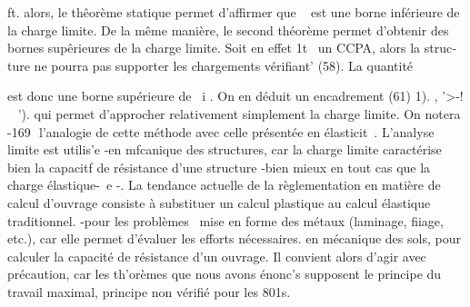 ft. 
alors, le thêorème statique permet d'affirmer que ~ est une borne inférieu­re de la charge limite. 
De la même manière, le second théorème permet d'obtenir des bornes supêrieures de la charge limite. Soit en effet 1t~ un CCPA, alors la struc­ture ne pourra pas supporter les chargements vérifiant' (58). La quantité 

est donc une borne supérieure de ~i . On en déduit un encadrement 
(61) 1). , '>-! ~ '). 
qui permet d'approcher relativement simplement la charge limite. On notera 
-169 ­
l'analogie de cette méthode avec celle présentée en élasticit~. 
L'analyse limite est utilis'e 
-en mfcanique des structures, car la charge limite caractérise bien la capacitf de résistance d'une structure -bien mieux en tout cas que la charge élastique-~e -. La tendance actuelle de la règlementation en matiè­re de calcul d'ouvrage consiste à substituer un calcul plastique au calcul élastique traditionnel. 
-pour les problèmes ~mise en forme des métaux (laminage, fiiage, etc.), car elle permet d'évaluer les efforts nécessaires. 
en mécanique des sols, pour calculer la capacité de résistance d'un ouvrage. Il convient alors d'agir avec précaution, car les th'orèmes que nous avons énonc's supposent le principe du travail maximal, principe non vérifié pour les 801s. 
